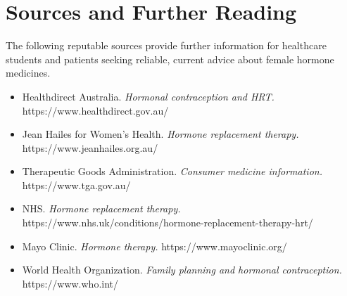 \section*{Sources and Further Reading}
The following reputable sources provide further information for healthcare students and patients seeking reliable, current advice about female hormone medicines.
\begin{itemize}
    \item Healthdirect Australia. \textit{Hormonal contraception and HRT.} https://www.healthdirect.gov.au/
    \item Jean Hailes for Women's Health. \textit{Hormone replacement therapy.} https://www.jeanhailes.org.au/
    \item Therapeutic Goods Administration. \textit{Consumer medicine information.} https://www.tga.gov.au/
    \item NHS. \textit{Hormone replacement therapy.} https://www.nhs.uk/conditions/hormone-replacement-therapy-hrt/
    \item Mayo Clinic. \textit{Hormone therapy.} https://www.mayoclinic.org/
    \item World Health Organization. \textit{Family planning and hormonal contraception.} https://www.who.int/
\end{itemize}
